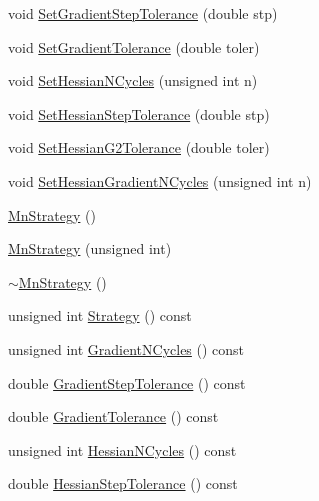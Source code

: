 \begin{DoxyCompactItemize}
\item 
void \mbox{\hyperlink{classROOT_1_1Minuit2_1_1MnStrategy_ad6051100db67df070103c2478740ee8f}{Set\+Gradient\+Step\+Tolerance}} (double stp)
\item 
void \mbox{\hyperlink{classROOT_1_1Minuit2_1_1MnStrategy_aa7e6c4626962cd81e05821955ff562aa}{Set\+Gradient\+Tolerance}} (double toler)
\item 
void \mbox{\hyperlink{classROOT_1_1Minuit2_1_1MnStrategy_a7d97d197e18c686e2cdb826ea514de28}{Set\+Hessian\+N\+Cycles}} (unsigned int n)
\item 
void \mbox{\hyperlink{classROOT_1_1Minuit2_1_1MnStrategy_a8711f7c9983983c83fd5d192bc9304f7}{Set\+Hessian\+Step\+Tolerance}} (double stp)
\item 
void \mbox{\hyperlink{classROOT_1_1Minuit2_1_1MnStrategy_aed3f2b229af4c5a4091507830f4275e0}{Set\+Hessian\+G2\+Tolerance}} (double toler)
\item 
void \mbox{\hyperlink{classROOT_1_1Minuit2_1_1MnStrategy_ad8984d94901eaf8cad19fe49647449bf}{Set\+Hessian\+Gradient\+N\+Cycles}} (unsigned int n)
\item 
\mbox{\hyperlink{classROOT_1_1Minuit2_1_1MnStrategy_a231337ee8aec47874370bc4b64683374}{Mn\+Strategy}} ()
\item 
\mbox{\hyperlink{classROOT_1_1Minuit2_1_1MnStrategy_ad70367966dc3b7cdf1be671acb3824d0}{Mn\+Strategy}} (unsigned int)
\item 
\mbox{\hyperlink{classROOT_1_1Minuit2_1_1MnStrategy_a65ddda119cec991c9d07671c1a8af521}{$\sim$\+Mn\+Strategy}} ()
\item 
unsigned int \mbox{\hyperlink{classROOT_1_1Minuit2_1_1MnStrategy_a1ff03f5ccec83aa19770d080b2be2334}{Strategy}} () const
\item 
unsigned int \mbox{\hyperlink{classROOT_1_1Minuit2_1_1MnStrategy_ab2f1980e3eb9f9b0818cf6f8c24b6311}{Gradient\+N\+Cycles}} () const
\item 
double \mbox{\hyperlink{classROOT_1_1Minuit2_1_1MnStrategy_a5352522cca1056c242a309d29e28e3c2}{Gradient\+Step\+Tolerance}} () const
\item 
double \mbox{\hyperlink{classROOT_1_1Minuit2_1_1MnStrategy_a94681b616c41570e2c81ef5c94cb81dd}{Gradient\+Tolerance}} () const
\item 
unsigned int \mbox{\hyperlink{classROOT_1_1Minuit2_1_1MnStrategy_ab2342c7f4896a8ed08c9df93fca93066}{Hessian\+N\+Cycles}} () const
\item 
double \mbox{\hyperlink{classROOT_1_1Minuit2_1_1MnStrategy_aaee4b3cbe14d4caa2d57fbc93b451ac2}{Hessian\+Step\+Tolerance}} () const

\end{DoxyCompactItemize}
